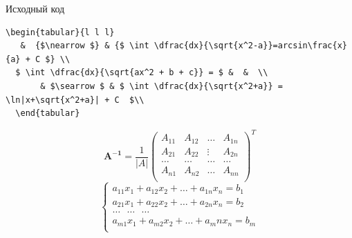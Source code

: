 \documentclass{beamer}
\begin{document}
\begin{frame}[fragile]{Исходный код}
\begin{adjustbox}{scale=0.5}
\begin{large}


 \begin{lstlisting}[language=Tex]
  \begin{tabular}{l l l} 
   &  {$\nearrow $} & {$ \int \dfrac{dx}{\sqrt{x^2-a}}=arcsin\frac{x}{a} + C $} \\
  $ \int \dfrac{dx}{\sqrt{ax^2 + b + c}} = $ &  &  \\ 
       & $\searrow $ & $ \int \dfrac{dx}{\sqrt{x^2+a}} = \ln|x+\sqrt{x^2+a}| + C  $\\ 
  \end{tabular}
\end{lstlisting}
\end{large}
\end{adjustbox}

\end{frame}

\begin{frame}



\begin{displaymath}
\mathbf{A^{-1}}=\dfrac{1}{|A|}
\left( \begin{array}{cccc}
A_{11} & A_{12} & \ldots & A_{1n} \\
A_{21} & A_{22} & \vdots & A_{2n} \\
\ldots & \ldots & \ldots & \ldots \\
A_{n1} & A_{n2} & \ldots & A_{nn} \\
\end{array} \right)^T
\end{displaymath}
\vspace{1cm}
\begin{displaymath}
\left\{ \begin{array}{l}
 a_{11}x_1 + a_{12}x_2 + \ldots + a_{1n}x_n = b_1 \\
 a_{21}x_1 + a_{22}x_2 + \ldots + a_{2n}x_n = b_2 \\
 \ldots \ \ \ \ldots \ \ \  \ldots \\
 a_{m1}x_1 + a_{m2}x_2 + \ldots + a_mn x_n = b_m \\                    
  \end{array} \right.
\end{displaymath}

\end{frame}
\end{document}
